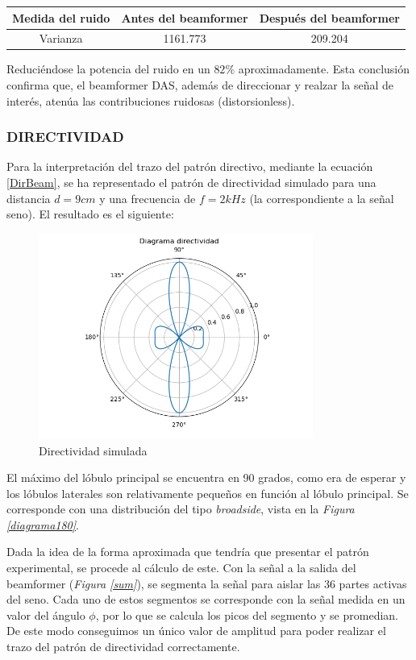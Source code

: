 \documentclass[a4paper,11pt]{book}
\begin{document}
\begin{tabular}{|c|c|c|}
\hline 
\textbf{Medida del ruido} & Antes del beamformer & Después del beamformer \\ 
\hline 
Varianza & 1161.773 & 209.204 \\ 
\hline 
\end{tabular} 
\linebreak

Reduciéndose la potencia del ruido en un $82\%$ aproximadamente. Esta conclusión confirma que, el beamformer DAS, además de direccionar y realzar la señal de interés, atenúa las contribuciones ruidosas (distorsionless).

\subsubsection{DIRECTIVIDAD}
Para la interpretación del trazo del patrón directivo, mediante la ecuación \ref{DirBeam}, se ha representado el patrón de directividad simulado para una distancia $d = 9 cm$ y una frecuencia de $f = 2kHz$ (la correspondiente a la señal seno). El resultado es el siguiente:

\begin{figure}[hbtp]
\centering
\includegraphics[width = 9cm]{FIGURAS/directividad_SIM.png}
\caption{Directividad simulada}
\label{patronSIM}
\end{figure}

El máximo del lóbulo principal se encuentra en 90 grados, como era de esperar y los lóbulos laterales son relativamente pequeños en función al lóbulo principal. Se corresponde con una distribución del tipo \textit{broadside}, vista en la \textit{Figura \ref{diagrama180}}.

Dada la idea de la forma aproximada que tendría que presentar el patrón experimental, se procede al cálculo de este. Con la señal a la salida del beamformer (\textit{Figura \ref{sum}}), se segmenta la señal para aislar las 36 partes activas del seno. Cada uno de estos segmentos se corresponde con la señal medida en un valor del ángulo $\phi$, por lo que se calcula los picos del segmento y se promedian. De este modo conseguimos un único valor de amplitud para poder realizar el trazo del patrón de directividad correctamente.
\end{document}
